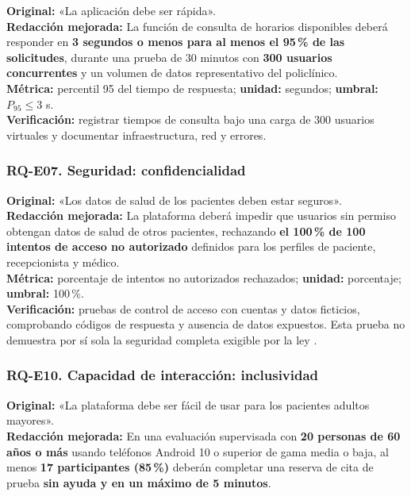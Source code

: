\documentclass[12pt,a4paper]{article}
\begin{document}
\textbf{Original:} «La aplicación debe ser rápida».\\

\textbf{Redacción mejorada:} La función de consulta de horarios disponibles deberá responder en \textbf{3 segundos o menos para al menos el 95\,\% de las solicitudes}, durante una prueba de 30 minutos con \textbf{300 usuarios concurrentes} y un volumen de datos representativo del policlínico.\\

\textbf{Métrica:} percentil 95 del tiempo de respuesta; \textbf{unidad:} segundos; \textbf{umbral:} $P_{95}\leq 3$ s.\\

\textbf{Verificación:} registrar tiempos de consulta bajo una carga de 300 usuarios virtuales y documentar infraestructura, red y errores.

\subsubsection*{RQ-E07. Seguridad: confidencialidad}

\textbf{Original:} «Los datos de salud de los pacientes deben estar seguros».\\

\textbf{Redacción mejorada:} La plataforma deberá impedir que usuarios sin permiso obtengan datos de salud de otros pacientes, rechazando \textbf{el 100\,\% de 100 intentos de acceso no autorizado} definidos para los perfiles de paciente, recepcionista y médico.\\

\textbf{Métrica:} porcentaje de intentos no autorizados rechazados; \textbf{unidad:} porcentaje; \textbf{umbral:} 100\,\%.\\

\textbf{Verificación:} pruebas de control de acceso con cuentas y datos ficticios, comprobando códigos de respuesta y ausencia de datos expuestos. Esta prueba no demuestra por sí sola la seguridad completa exigible por la ley \cite{lopdp}.

\subsubsection*{RQ-E10. Capacidad de interacción: inclusividad}

\textbf{Original:} «La plataforma debe ser fácil de usar para los pacientes adultos mayores».\\

\textbf{Redacción mejorada:} En una evaluación supervisada con \textbf{20 personas de 60 años o más} usando teléfonos Android 10 o superior de gama media o baja, al menos \textbf{17 participantes (85\,\%)} deberán completar una reserva de cita de prueba \textbf{sin ayuda y en un máximo de 5 minutos}.\\
\end{document}
